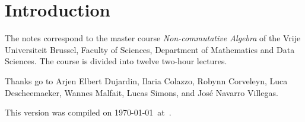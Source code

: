 \section*{Introduction}

The notes correspond to the master  
course \emph{Non-commutative Algebra} of the 
Vrije Universiteit Brussel, 
Faculty of Sciences, 
Department of Mathematics and Data Sciences. The course
is divided into twelve two-hour lectures. 


 
Thanks go to Arjen Elbert Dujardin, Ilaria Colazzo, Robynn Corveleyn, 
Luca Descheemaeker, Wannes Malfait, Lucas Simons, 
and
José Navarro Villegas. 

This version 
was compiled on \today~at~\currenttime.

